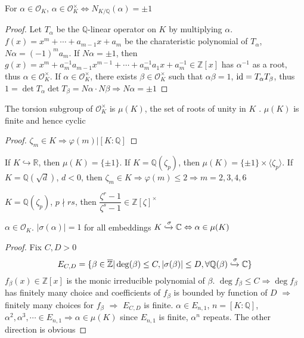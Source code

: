 \documentclass[../main.tex]{subfiles}
\begin{document}
\begin{proposition}
For $\alpha\in\mathcal O_K$, $\alpha\in\mathcal O_K^\times\Leftrightarrow N_{K/\mathbb Q}(\alpha)=\pm1$
\end{proposition}

\begin{proof}
Let $T_\alpha$ be the $\mathbb Q$-linear operator on $K$ by multiplying $\alpha$. $f(x)=x^m+\cdots+a_{m-1}x+a_m$ be the charateristic polynomial of $T_\alpha$, $N\alpha=(-1)^ma_m$. If $N\alpha=\pm1$, then $g(x)=x^m+a_m^{-1}a_{m-1}x^{m-1}+\cdots+a_m^{-1}a_{1}x+a_m^{-1}\in\mathbb Z[x]$ has $\alpha^{-1}$ as a root, thus $\alpha\in\mathcal O_K^\times$. If $\alpha\in\mathcal O_K^\times$, there exists $\beta\in\mathcal O_K^\times$ such that $\alpha\beta=1$, $\operatorname{id}=T_\alpha T_\beta$, thus $1=\det T_\alpha\det T_\beta=N\alpha\cdot N\beta\Rightarrow N\alpha=\pm1$
\end{proof}

\begin{lemma}
The torsion subgroup of $\mathcal O_K^\times$ is $\mu(K)$, the set of roots of unity in $K$ . $\mu(K)$ is finite and hence cyclic
\end{lemma}

\begin{proof}
 $\zeta_m\in K\Rightarrow\varphi(m)|[K:\mathbb Q]$
\end{proof}

\begin{example}
If $K\hookrightarrow\mathbb R$, then $\mu(K)=\{\pm1\}$. If $K=\mathbb Q(\zeta_p)$, then $\mu(K)=\{\pm1\}\times\langle\zeta_p\rangle$. If $K=\mathbb Q(\sqrt d)$, $d<0$, then $\zeta_m\in K\Rightarrow\varphi(m)\leq 2\Rightarrow m=2,3,4,6$
\end{example}

\begin{example}
$K=\mathbb Q(\zeta_p)$, $p\nmid rs$, then $\dfrac{\zeta^r-1}{\zeta^s-1}\in\mathbb Z[\zeta]^\times$
\end{example}

\begin{proposition}\label{alpha in mu(K) <=> |sigma(alpha)|=1}
$\alpha\in\mathcal O_K$. $|\sigma(\alpha)|=1$ for all embeddings $K\xhookrightarrow\sigma\mathbb C\Leftrightarrow\alpha\in\mu(K)$
\end{proposition}

\begin{proof}
Fix $C,D>0$
\[E_{C,D}=\{\beta\in\overline{\mathbb Z}|\deg(\beta)\leq C,|\sigma(\beta)|\leq D,\forall \mathbb Q(\beta)\xhookrightarrow\sigma\mathbb C\}\]
$f_\beta(x)\in\mathbb Z[x]$ is the monic irreducible polynomial of $\beta$. $\deg f_\beta\leq C\Rightarrow \deg f_\beta$ has finitely many choice and coefficients of $f_\beta$ is bounded by function of $D$ $\Rightarrow$ finitely many choices for $f_\beta$ $\Rightarrow$ $E_{C,D}$ is finite. $\alpha\in E_{n,1}$, $n=[K:\mathbb Q]$, $\alpha^2,\alpha^3,\cdots\in E_{n,1}\Rightarrow\alpha\in\mu(K)$ since $E_{n,1}$ is finite, $\alpha^n$ repeats. The other direction is obvious
\end{proof}
\end{document}
